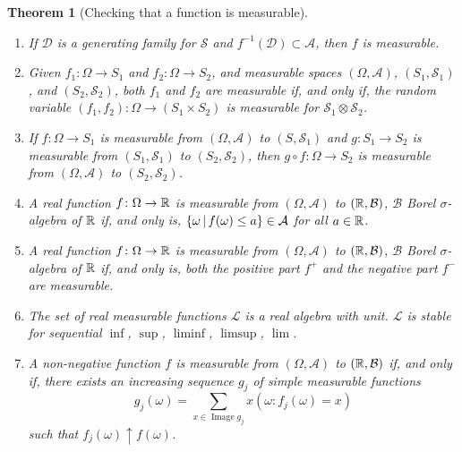 \documentclass[12pt,a4paper]{amsart}
\theoremstyle{plain}
\newtheorem{theorem}{Theorem}%
\theoremstyle{definition}
\theoremstyle{remark}
\begin{document}
\begin{theorem}[Checking that a function is
  measurable]\label{th:checkmeasurable}\
  \begin{enumerate}
  \item If $\mathcal D$ is a generating family for $\mathcal S$ and
    $f^{-1}(\mathcal D) \subset \mathcal A$, then $f$ is measurable.
  \item Given $f_1 \colon \Omega \to S_1$ and $f_2 \colon \Omega \to
    S_2$, and measurable spaces $(\Omega,\mathcal A)$, $(S_1,\mathcal
    S_1)$, and $(S_2,\mathcal S_2)$, both $f_1$ and $f_2$ are
    measurable if, and only if, the random variable $(f_1,f_2) \colon
    \Omega \to (S_1 \times S_2)$ is measurable for $\mathcal S_1
    \otimes \mathcal S_2$.
  \item If $f \colon \Omega \to S_1$ is measurable from
    $(\Omega,\mathcal A)$ to $(S,\mathcal S_1)$ and
    $g \colon S_1 \to S_2$ is measurable from $(S_1,\mathcal S_1)$ to
    $(S_2,\mathcal S_2)$, then $g \circ f \colon \Omega \to S_2$ is
    measurable from $(\Omega,\mathcal A)$ to $(S_2,\mathcal
    S_2)$.
  \item A real function $f \colon \Omega \to \mathbb{R}$ is measurable
    from $(\Omega,\mathcal A)$ to $(\mathbb{R},\mathcal B)$, $\mathcal B$
    Borel $\sigma$-algebra of $\mathbb{R}$ if, and only is,
    $\left\{\omega \, \middle| \, f(\omega) \leq a \right\} \in \mathcal A$ for all
    $a \in \mathbb{R}$.
  \item A real function $f \colon \Omega \to \mathbb{R}$ is measurable
    from $(\Omega,\mathcal A)$ to $(\mathbb{R},\mathcal B)$, $\mathcal B$
    Borel $\sigma$-algebra of $\mathbb{R}$ if, and only is, both the
    positive part $f^+$ and the negative part $f^-$ are measurable.
  \item The set of real measurable functions $\mathcal L$ is a real algebra with
    unit. $\mathcal L$ is stable for sequential $\inf$, $\sup$, $\liminf$,
    $\limsup$, $\lim$.
  \item \label{item:upsimple} A non-negative function $f$ is measurable from
    $(\Omega,\mathcal A)$ to $(\mathbb{R},\mathcal B)$ if, and only if,
    there exists an increasing sequence $g_j$ of simple measurable
    functions
    \begin{equation*}
      g_j(\omega) = \sum_{x \in \operatorname{Image} g_j} x (\omega : f_j(\omega) = x)
    \end{equation*}
    such that $f_j(\omega) \uparrow f(\omega)$.
  \end{enumerate}
\end{theorem}
\end{document}
